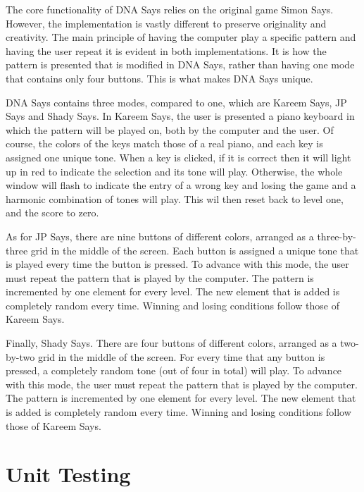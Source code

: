 \documentclass[12pt, titlepage]{article}
\begin{document}
\begin{itemize}
\par The core functionality of DNA Says relies on the original game Simon Says. However, the implementation is vastly different to preserve originality and creativity. The main principle of having the computer play a specific pattern and having the user repeat it is evident in both implementations. It is how the pattern is presented that is modified in DNA Says, rather than having one mode that contains only four buttons. This is what makes DNA Says unique. 
\\
\par DNA Says contains three modes, compared to one, which are Kareem Says, JP Says and Shady Says. In Kareem Says, the user is presented a piano keyboard in which the pattern will be played on, both by the computer and the user. Of course, the colors of the keys match those of a real piano, and each key is assigned one unique tone. When a key is clicked, if it is correct then it will light up in red to indicate the selection and its tone will play. Otherwise, the whole window will flash to indicate the entry of a wrong key and losing the game and a harmonic combination of tones will play. This wil then reset back to level one, and the score to zero.
\\
\par As for JP Says, there are nine buttons of different colors, arranged as a three-by-three grid in the middle of the screen. Each button is assigned a unique tone that is played every time the button is pressed. To advance with this mode, the user must repeat the pattern that is played by the computer. The pattern is incremented by one element for every level. The new element that is added is completely random every time. Winning and losing conditions follow those of Kareem Says.
\\
\par Finally, Shady Says. There are four buttons of different colors, arranged as a two-by-two grid in the middle of the screen. For every time that any button is pressed, a completely random tone (out of four in total) will play. To advance with this mode, the user must repeat the pattern that is played by the computer. The pattern is incremented by one element for every level. The new element that is added is completely random every time. Winning and losing conditions follow those of Kareem Says.


\section{Unit Testing}


\end{itemize}
\end{document}
